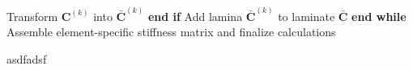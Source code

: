 \begin{algorithm}
\begin{algorithmic}[1]
		\State \hspace{\algorithmicindent} \hspace{\algorithmicindent} \hspace{\algorithmicindent} \hspace{\algorithmicindent} \hspace{\algorithmicindent} Transform $\mathbf{C}^{(k)}$ into $\bar{\mathbf{C}}^{(k)}$
		\State \hspace{\algorithmicindent} \hspace{\algorithmicindent} \hspace{\algorithmicindent} \hspace{\algorithmicindent}\textbf{end if}
		\State \hspace{\algorithmicindent} \hspace{\algorithmicindent} \hspace{\algorithmicindent} \hspace{\algorithmicindent}Add lamina $\bar{\mathbf{C}}^{(k)}$ to laminate $\bar{\mathbf{C}}$
		\State \hspace{\algorithmicindent} \hspace{\algorithmicindent} \hspace{\algorithmicindent} \textbf{end while}
		\State \hspace{\algorithmicindent}Assemble element-specific stiffness matrix and finalize calculations
	\end{algorithmic}
\end{algorithm}



asdfadsf


